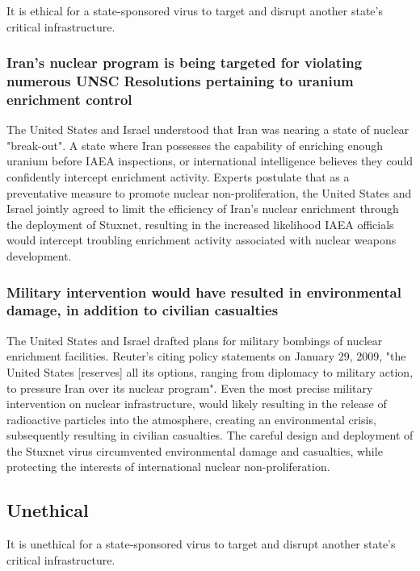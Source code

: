 \documentclass[12pt]{article}
\begin{document}
\begin{multicols}{2}
It is ethical for a state-sponsored virus to target and disrupt another state's critical infrastructure.

\subsubsection{Iran's nuclear program is being targeted for violating numerous UNSC Resolutions pertaining to uranium enrichment control}

The United States and Israel understood that Iran was nearing a state of nuclear "break-out". A state where Iran possesses the capability of enriching enough uranium before IAEA inspections, or international intelligence believes they could confidently intercept enrichment activity. Experts postulate that as a preventative measure to promote nuclear non-proliferation, the United States and Israel jointly agreed to limit the efficiency of Iran's nuclear enrichment through the deployment of Stuxnet, resulting in the increased likelihood IAEA officials would intercept troubling enrichment activity associated with nuclear weapons development.\cite{theRealStoryOfStuxnet}

\subsubsection{Military intervention would have resulted in environmental damage, in addition to civilian casualties}

The United States and Israel drafted plans for military bombings of nuclear enrichment facilities. Reuter's citing policy statements on January 29, 2009, "the United States [reserves] all its options, ranging from diplomacy to military action, to pressure Iran over its nuclear program".\cite{usOptionsForIran} Even the most precise military intervention on nuclear infrastructure, would likely resulting in the release of radioactive particles into the atmosphere, creating an environmental crisis, subsequently resulting in civilian casualties. The careful design and deployment of the Stuxnet virus circumvented environmental damage and casualties, while protecting the interests of international nuclear non-proliferation.

\subsection{Unethical}

It is unethical for a state-sponsored virus to target and disrupt another state's critical infrastructure.


\end{multicols}
\end{document}

